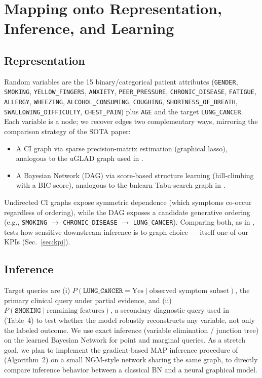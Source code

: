 \documentclass[conference]{IEEEtran}
\begin{document}
	\section{Mapping onto Representation, Inference, and Learning}
	
	\subsection{Representation}
	Random variables are the 15 binary/categorical patient attributes (\texttt{GENDER}, \texttt{SMOKING}, \texttt{YELLOW\_FINGERS}, \texttt{ANXIETY}, \texttt{PEER\_PRESSURE}, \texttt{CHRONIC\_DISEASE}, \texttt{FATIGUE}, \texttt{ALLERGY}, \texttt{WHEEZING}, \texttt{ALCOHOL\_CONSUMING}, \texttt{COUGHING}, \texttt{SHORTNESS\_OF\_BREATH}, \texttt{SWALLOWING\_DIFFICULTY}, \texttt{CHEST\_PAIN}) plus \texttt{AGE} and the target \texttt{LUNG\_CANCER}. Each variable is a node; we recover edges two complementary ways, mirroring the comparison strategy of the SOTA paper:
	\begin{itemize}
		\item A CI graph via sparse precision-matrix estimation (graphical lasso), analogous to the uGLAD graph used in \cite{ngm2022}.
		\item A Bayesian Network (DAG) via score-based structure learning (hill-climbing with a BIC score), analogous to the bnlearn Tabu-search graph in \cite{ngm2022}.
	\end{itemize}
	Undirected CI graphs expose symmetric dependence (which symptoms co-occur regardless of ordering), while the DAG exposes a candidate generative ordering (e.g., \texttt{SMOKING} $\rightarrow$ \texttt{CHRONIC\_DISEASE} $\rightarrow$ \texttt{LUNG\_CANCER}). Comparing both, as in \cite{ngm2022}, tests how sensitive downstream inference is to graph choice --- itself one of our KPIs (Sec.~\ref{sec:kpi}).
	
	\subsection{Inference}
	Target queries are (i) $P(\texttt{LUNG\_CANCER} = \text{Yes} \mid \text{observed symptom subset})$, the primary clinical query under partial evidence, and (ii) $P(\texttt{SMOKING} \mid \text{remaining features})$, a secondary diagnostic query used in \cite{ngm2022} (Table~4) to test whether the model robustly reconstructs any variable, not only the labeled outcome. We use exact inference (variable elimination / junction tree) on the learned Bayesian Network for point and marginal queries. As a stretch goal, we plan to implement the gradient-based MAP inference procedure of \cite{ngm2022} (Algorithm~2) on a small NGM-style network sharing the same graph, to directly compare inference behavior between a classical BN and a neural graphical model.
	
\end{document}

